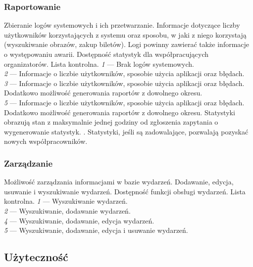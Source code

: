 \documentclass[10pt]{dokument-ppi}
\begin{document}
\subsubsection{Raportowanie}
\begin{requirement}
    \desc%
        Zbieranie logów systemowych i ich przetwarzanie. Informacje dotyczące
        liczby użytkowników korzystających z systemu oraz sposobu, w jaki z
        niego korzystają (wyszukiwanie obrazów, zakup biletów). Logi powinny
        zawierać także informacje o występowaniu awarii.
    \metric%
        Dostępność statystyk dla współpracujących organizatorów.
    \tool%
        Lista kontrolna.
    \scale%
        \emph{1} --- Brak logów systemowych.\\
        \emph{2} --- Informacje o liczbie użytkowników, sposobie użycia aplikacji oraz błędach.\\
        \emph{3} --- Informacje o liczbie użytkowników, sposobie użycia aplikacji oraz błędach. Dodatkowo możliwość generowania raportów z dowolnego okresu.\\
        \emph{5} --- Informacje o liczbie użytkowników, sposobie użycia aplikacji oraz błędach. Dodatkowo możliwość generowania raportów z dowolnego okresu. Statystyki obrazują stan z maksymalnie jednej godziny od zgłoszenia zapytania o wygenerowanie statystyk.
    . Statystyki, jeśli są zadowalające, pozwalają pozyskać nowych
        współpracowników.
\end{requirement}

\subsubsection{Zarządzanie}
\begin{requirement}
    \desc%
        Możliwość zarządzania informacjami w bazie wydarzeń. Dodawanie, edycja, usuwanie i wyszukiwanie wydarzeń.
    \metric%
        Dostępność funkcji obsługi wydarzeń.
    \tool%
        Lista kontrolna.
    \scale%
        \emph{1} --- Wyszukiwanie wydarzeń.\\
        \emph{2} --- Wyszukiwanie, dodawanie wydarzeń.\\
        \emph{4} --- Wyszukiwanie, dodawanie, edycja wydarzeń.\\
        \emph{5} --- Wyszukiwanie, dodawanie, edycja i usuwanie wydarzeń.
\end{requirement}


\subsection{Użyteczność}
\end{document}
